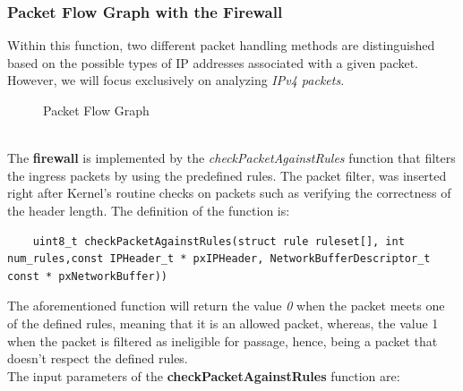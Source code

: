 \documentclass{exam}
\begin{document}
\subsubsection*{Packet Flow Graph with the Firewall}
Within this function, two different packet handling methods are distinguished based on the possible types of IP addresses associated with a given packet. However, we will focus exclusively on analyzing \textit{IPv4 packets}.
\begin{figure}[h]
    \centering
    
    \caption{Packet Flow Graph}
    \label{figure1}
\end{figure}
\\The \textbf{firewall} is implemented by the \textit{checkPacketAgainstRules} function that filters the ingress packets by using the predefined rules. The packet filter, was inserted right after Kernel's routine checks on packets such as verifying the correctness of the header length.
The definition of the function is:
\begin{lstlisting}
    uint8_t checkPacketAgainstRules(struct rule ruleset[], int num_rules,const IPHeader_t * pxIPHeader, NetworkBufferDescriptor_t const * pxNetworkBuffer))
\end{lstlisting}
The aforementioned function will return the value \textit{0} when the packet meets one of the defined rules, meaning that it is an allowed packet, whereas, the value 1 when the packet is filtered as ineligible for passage, hence, being a packet that doesn't respect the defined rules.
\\The input parameters of the \textbf{checkPacketAgainstRules} function are:
\end{document}
